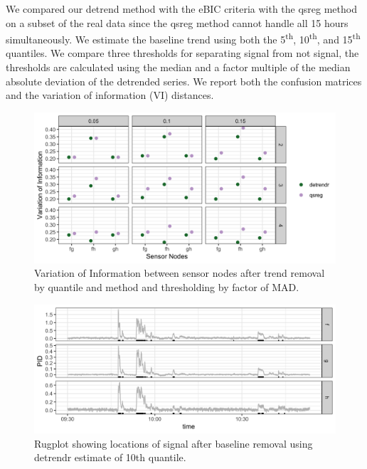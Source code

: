 \documentclass[12pt]{article}
\begin{document}
	We compared our detrend method with the eBIC criteria with the qsreg method on a subset of the real data since the qsreg method cannot handle all 15 hours simultaneously. We estimate the baseline trend using both the 5\textsuperscript{th}, 10\textsuperscript{th}, and 15\textsuperscript{th} quantiles. We compare three thresholds for separating signal from not signal, the thresholds are calculated using the median and a factor multiple of the median absolute deviation of the detrended series. We report both the confusion matrices and the variation of information (VI) distances. 
	

	
		\begin{figure}
		\centering
		\caption{Variation of Information between sensor nodes after trend removal by quantile and method and thresholding by factor of MAD.}
		\includegraphics[width = .9\linewidth]{Figures/VI_app_short.png}
	\end{figure}
	
	
	\begin{figure}
		\caption{Rugplot showing locations of signal after baseline removal using detrendr estimate of 10th quantile.}
		\includegraphics[width = \linewidth]{Figures/corrected_rugplot.png}
	\end{figure}
\end{document}
